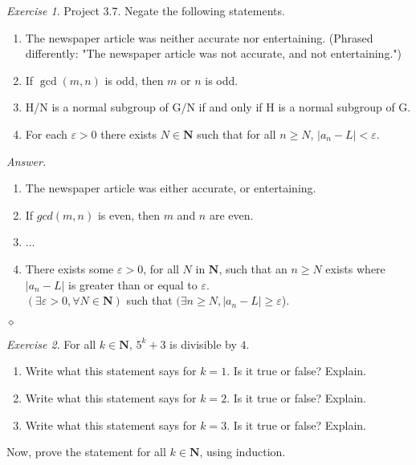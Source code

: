\documentclass[12pt,oneside]{amsart}
\theoremstyle{remark}
\newtheorem{exer}{Exercise}
\newcommand{\bfN}{\mathbf{N}}
\newenvironment{answer}{\bigskip\noindent\emph{Answer.}}{\hfill$\diamond$\newline}
\begin{document}
%
%
%
%

\newpage
\begin{exer}
Project 3.7. Negate the following statements.
\begin{enumerate}[label={(\roman*)},start={4}]
\item The newspaper article was neither accurate nor entertaining. (Phrased differently: "The newspaper article was not accurate, and not entertaining.")
\item If $\gcd(m,n)$ is odd, then $m$ or $n$ is odd.
\item H/N is a normal subgroup of G/N if and only if H is a normal subgroup of G.
\item For each $\varepsilon > 0$ there exists $N \in \mathbf{N}$ such that
for all $n \geq N$, $|a_n-L| < \varepsilon$.
\end{enumerate}
\end{exer}

\begin{answer}
\begin{enumerate}[label={(\roman*)},start={4}]
\item The newspaper article was either accurate, or entertaining.
\item If $gcd(m, n)$ is even, then $m$ and $n$ are even.
\item ... %
\item There exists some $\varepsilon > 0$, for all $N$ in $\bfN$, such that an $n \geq N$ exists where $|a_n - L|$ is greater than or equal to $\varepsilon$.\\ $(\exists \varepsilon > 0, \forall N \in \bfN)$ such that $(\exists n \geq N, |a_n - L| \geq \varepsilon$).
\end{enumerate}
\end{answer}

%
%
%
%

\newpage
\begin{exer}
For all $k \in \mathbf{N}$, $5^k + 3$ is divisible by $4$.
\begin{enumerate}
\item Write what this statement says for $k=1$. Is it true or false? Explain.
\item Write what this statement says for $k=2$. Is it true or false? Explain.
\item Write what this statement says for $k=3$. Is it true or false? Explain.
\end{enumerate}
Now, prove the statement for all $k \in \mathbf{N}$, using induction.
\end{exer}
\end{document}
